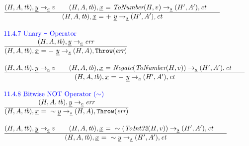\documentclass[a4paper, leqno]{amsart}
\newcommand{\rulesep}{\quad\quad}
\newcommand{\stmt}{s}
\newcommand{\expr}{e}
\newcommand{\ir}[1]{\ensuremath{\underline{#1}}}
\newcommand{\irid}{\ir{x}}
\def\inblue{\color{blue}}
\newcommand{\tb}{\emph{tb}}
\newcommand{\err}{\emph{err}}
\newcommand{\ct}{\emph{ct}}
\newcommand{\hf}[1]{\emph{#1}}
\newcommand{\error}{\ensuremath{{\tt Throw}(\err)}}
\newcommand{\state}{\ensuremath{(H,A,\tb)}}
\newcommand{\res}{\ensuremath{(H,A)}}
\newcommand{\resp}{\ensuremath{(H',A')}}
\newcommand{\evale}{\ensuremath{(H,A,\tb)}}
\def\inblue{\color{blue}}
\begin{document}
\[\begin{array}{l@{~~}l@{~~}ll}
\frac{\begin{matrix}
\evale, \ir{y} \rightarrow_{\ir\expr} v
\rulesep
\state, \irid \ {\tt =} \ \hf{ToNumber}(H,v) \rightarrow_{\ir\stmt} \resp, \ct
\rulesep
\end{matrix}}{\begin{matrix}
\state, \irid \ {\tt =} \ {\tt +}\ \ir{y}
\rightarrow_{\ir\stmt}
\resp, \ct
\end{matrix}}
\\[2em]

\mbox{\inblue 11.4.7 Unary {\tt -} Operator}\\
\frac{\begin{matrix}
\evale, \ir{y} \rightarrow_{\ir\expr} \err
\end{matrix}}{\begin{matrix}
\state, \irid \ {\tt =} \ {\tt -}\ \ir{y}
\rightarrow_{\ir\stmt}
\res, \error
\end{matrix}}
\\[2em]

\frac{\begin{matrix}
\evale, \ir{y} \rightarrow_{\ir\expr} v
\rulesep
\state, \irid \ {\tt =} \ \hf{Negate}(\hf{ToNumber}(H,v)) \rightarrow_{\ir\stmt} \resp, \ct
\rulesep
\end{matrix}}{\begin{matrix}
\state, \irid \ {\tt =} \ {\tt -}\ \ir{y}
\rightarrow_{\ir\stmt}
\resp, \ct
\end{matrix}}
\\[2em]

\mbox{\inblue 11.4.8 Bitwise NOT Operator ($\sim$)}\\
\frac{\begin{matrix}
\evale, \ir{y} \rightarrow_{\ir\expr} \err
\end{matrix}}{\begin{matrix}
\state, \irid \ {\tt =} \ \sim \ir{y}
\rightarrow_{\ir\stmt}
\res, \error
\end{matrix}}
\\[2em]

\frac{\begin{matrix}
\evale, \ir{y} \rightarrow_{\ir\expr} v
\rulesep
\state, \irid \ {\tt =} \ \sim(\hf{ToInt32}(H,v)) \rightarrow_{\ir\stmt} \resp, \ct
\rulesep
\end{matrix}}{\begin{matrix}
\state, \irid \ {\tt =} \ \sim \ir{y}
\rightarrow_{\ir\stmt}
\resp, \ct
\end{matrix}}
\\[2em]


\end{array}\]
\end{document}
